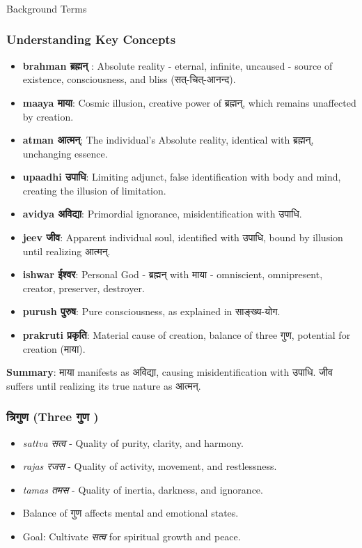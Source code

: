 \begin{frame}[fragile]\frametitle{}
\begin{center}
{\Large Background Terms}
\end{center}
\end{frame}

\begin{frame}[fragile]\frametitle{Understanding Key Concepts}
      \begin{itemize}
        \item \textbf{brahman ब्रह्मन् }: Absolute reality - eternal, infinite, uncaused - source of existence, consciousness, and bliss (सत्-चित्-आनन्द).
        \item \textbf{maaya माया}: Cosmic illusion, creative power of ब्रह्मन्, which remains unaffected by creation.
        \item \textbf{atman आत्मन्}: The individual’s Absolute reality, identical with ब्रह्मन्, unchanging essence.
        \item \textbf{upaadhi उपाधि}: Limiting adjunct, false identification with body and mind, creating the illusion of limitation.
        \item \textbf{avidya अविद्या}: Primordial ignorance, misidentification with उपाधि.
        \item \textbf{jeev जीव}: Apparent individual soul, identified with उपाधि, bound by illusion until realizing आत्मन्.
        \item \textbf{ishwar ईश्वर}: Personal God - ब्रह्मन् with माया - omniscient, omnipresent, creator, preserver, destroyer.
        \item \textbf{purush पुरुष}: Pure consciousness, as explained in साङ्ख्य-योग.
        \item \textbf{prakruti प्रकृति}: Material cause of creation, balance of three गुण, potential for creation (माया).
      \end{itemize}

\textbf{Summary}: माया manifests as अविद्या, causing misidentification with उपाधि. जीव suffers until realizing its true nature as आत्मन्.
\end{frame}

\begin{frame}[fragile]\frametitle{त्रिगुण  (Three गुण )}

      \begin{itemize}
		\item \textit{sattva सत्व } - Quality of purity, clarity, and harmony.
		\item \textit{rajas रजस } - Quality of activity, movement, and restlessness.
		\item \textit{tamas तमस } - Quality of inertia, darkness, and ignorance.
		\item Balance of गुण  affects mental and emotional states.
		\item Goal: Cultivate \textit{सत्व} for spiritual growth and peace.
	  \end{itemize}

\end{frame}


